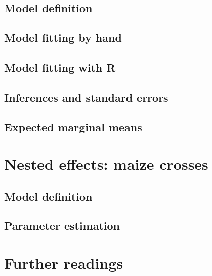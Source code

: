 \documentclass[a4paper,12pt,oneside]{book}
\begin{document}
\hypertarget{model-definition-2}{%
\subsection{Model definition}\label{model-definition-2}}

\hypertarget{model-fitting-by-hand-1}{%
\subsection{Model fitting by hand}\label{model-fitting-by-hand-1}}

\hypertarget{model-fitting-with-r-1}{%
\subsection{Model fitting with R}\label{model-fitting-with-r-1}}

\hypertarget{inferences-and-standard-errors}{%
\subsection{Inferences and standard errors}\label{inferences-and-standard-errors}}

\hypertarget{expected-marginal-means-1}{%
\subsection{Expected marginal means}\label{expected-marginal-means-1}}

\hypertarget{nested-effects-maize-crosses}{%
\section{Nested effects: maize crosses}\label{nested-effects-maize-crosses}}

\hypertarget{model-definition-3}{%
\subsection{Model definition}\label{model-definition-3}}

\hypertarget{parameter-estimation-1}{%
\subsection{Parameter estimation}\label{parameter-estimation-1}}

\hypertarget{further-readings-8}{%
\section{Further readings}\label{further-readings-8}}
\end{document}

